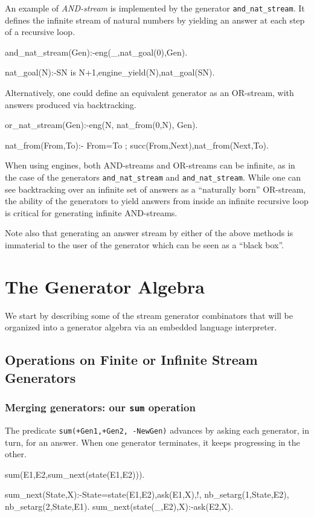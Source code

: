\documentclass{new_tlp}
\begin{document}
An example of {\em AND-stream} is  implemented
by the generator {\tt and\_nat\_stream}. 
It defines the infinite stream of natural numbers 
by yielding an answer at each step of a recursive loop.
\begin{code}
and_nat_stream(Gen):-eng(_,nat_goal(0),Gen).

nat_goal(N):-SN is N+1,engine_yield(N),nat_goal(SN).
\end{code}

Alternatively, one could define 
an equivalent generator as an OR-stream,  with answers 
produced via  backtracking.
\begin{code}
or_nat_stream(Gen):-eng(N, nat_from(0,N), Gen).

nat_from(From,To):- From=To ; succ(From,Next),nat_from(Next,To).
\end{code}

When using engines, 
both AND-streams and OR-streams can be infinite, as in the
case of the generators {\tt and\_nat\_stream} and {\tt and\_nat\_stream}.
While one can see backtracking over an infinite set of answers as
a ``naturally born'' OR-stream, the ability of the generators to
yield answers from inside an infinite recursive loop is critical
for generating infinite AND-streams.

Note also that generating an answer stream by either of the above methods
is immaterial to the user of the generator which can be seen as a ``black box''.



\section{The Generator Algebra}
We start by describing some of the stream generator combinators
that will be organized into a generator algebra 
via an embedded language interpreter.
 
\subsection{Operations on Finite or  Infinite Stream Generators}

\subsubsection{Merging generators: our {\tt sum} operation}

The predicate {\tt sum(+Gen1,+Gen2, -NewGen)} advances by asking each generator, in turn, for an answer. When one generator terminates, it keeps progressing in the other.
\begin{code}
sum(E1,E2,sum_next(state(E1,E2))).

sum_next(State,X):-State=state(E1,E2),ask(E1,X),!,
  nb_setarg(1,State,E2),
  nb_setarg(2,State,E1).
sum_next(state(_,E2),X):-ask(E2,X).
\end{code}
\end{document}
